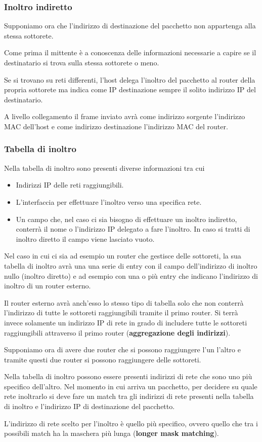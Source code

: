 \subsubsection{Inoltro indiretto}
Supponiamo ora che l'indirizzo di destinazione del pacchetto non 
appartenga alla stessa sottorete.

Come prima il mittente è a conoscenza delle informazioni necessarie a
capire se il destinatario si trova sulla stessa sottorete o meno.

Se si trovano su reti differenti, l'host delega l'inoltro del 
pacchetto al router della propria sottorete ma indica come IP
destinazione sempre il solito indirizzo IP del destinatario.

A livello collegamento il frame inviato avrà come indirizzo sorgente
l'indirizzo MAC dell'host e come indirizzo destinazione l'indirizzo 
MAC del router.

\subsubsection{Tabella di inoltro}
Nella tabella di inoltro sono presenti diverse informazioni tra cui
\begin{itemize}
	\item Indirizzi IP delle reti raggiungibili.
	\item L'interfaccia per effettuare l'inoltro verso una specifica
		rete.
	\item Un campo che, nel caso ci sia bisogno di effettuare un 
		inoltro indiretto, conterrà il nome o l'indirizzo IP delegato
		a fare l'inoltro. In caso si tratti di inoltro diretto il 
		campo viene lasciato vuoto.
\end{itemize}
Nel caso in cui ci sia ad esempio un router che gestisce delle 
sottoreti, la sua tabella di inoltro avrà una una serie di entry con
il campo dell'indirizzo di inoltro nullo (inoltro diretto) e ad 
esempio con una o più entry che indicano l'indirizzo di inoltro di 
un router
esterno.

Il router esterno avrà anch'esso lo stesso tipo di tabella solo che 
non conterrà l'indirizzo di tutte le sottoreti raggiungibili tramite
il primo router. Si terrà invece solamente un indirizzo IP di rete in
grado di includere tutte le sottoreti raggiungibili attraverso il 
primo router (\textbf{aggregazione degli indirizzi}).

Supponiamo ora di avere due router che si possono raggiungere l'un
l'altro e tramite questi due router si possono raggiungere delle
sottoreti.

Nella tabella di inoltro possono essere presenti indirizzi di rete che
sono uno più specifico dell'altro. Nel momento in cui arriva un
pacchetto, per decidere su quale rete inoltrarlo si deve fare un match
tra gli indirizzi di rete presenti nella tabella di inoltro e 
l'indirizzo IP di destinazione del pacchetto.

L'indirizzo di rete scelto per l'inoltro è quello più specifico, 
ovvero quello che tra i possibili match ha la maschera più lunga
(\textbf{longer mask matching}).

